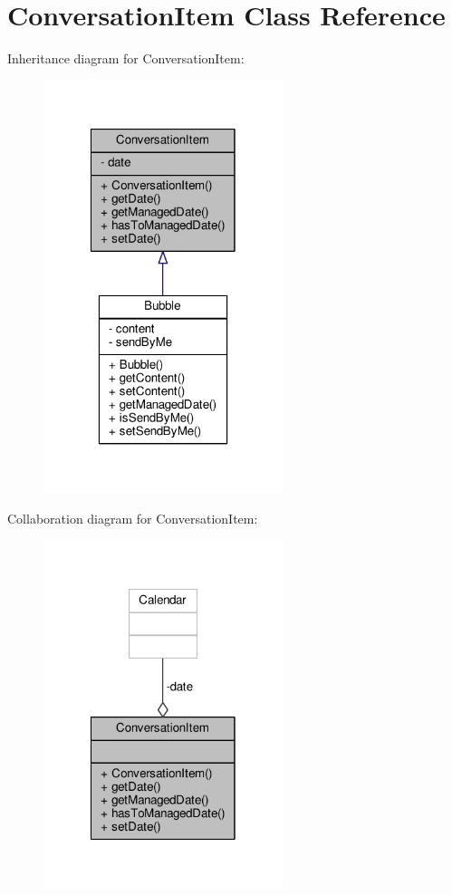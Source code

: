 \hypertarget{a00007}{\section{Conversation\+Item Class Reference}
\label{a00007}
}


Inheritance diagram for Conversation\+Item\+:
\nopagebreak
\begin{figure}[H]
\begin{center}
\leavevmode
\includegraphics[width=198pt]{a00062}
\end{center}
\end{figure}


Collaboration diagram for Conversation\+Item\+:
\nopagebreak
\begin{figure}[H]
\begin{center}
\leavevmode
\includegraphics[width=198pt]{a00063}
\end{center}
\end{figure}
